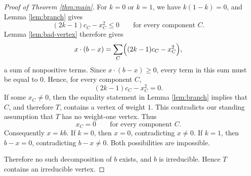 \documentclass[12pt]{article}
\begin{document}
\begin{proof}[Proof of Theorem \ref{thm:main}]
For \(k=0\) or \(k=1\), we have \(k(1-k)=0\), and Lemma \ref{lem:branch} gives
\[
(2k-1)c_C-x_C^2\le 0
\qquad\text{for every component }C.
\]
Lemma \ref{lem:bad-vertex} therefore gives
\[
x\cdot(b-x)
=
\sum_C\Bigl((2k-1)c_C-x_C^2\Bigr),
\]
a sum of nonpositive terms. Since \(x\cdot(b-x)\ge 0\), every term in this sum must be equal to \(0\). Hence, for every component \(C\),
\[
(2k-1)c_C-x_C^2=0.
\]
If some \(x_C\ne 0\), then the equality statement in Lemma \ref{lem:branch} implies that \(C\), and therefore \(T\), contains a vertex of weight \(1\). This contradicts our standing assumption that \(T\) has no weight-one vertex. Thus
\[
x_C=0
\qquad\text{for every component }C.
\]
Consequently \(x=kb\). If \(k=0\), then \(x=0\), contradicting \(x\ne 0\). If \(k=1\), then \(b-x=0\), contradicting \(b-x\ne 0\). Both possibilities are impossible.

Therefore no such decomposition of \(b\) exists, and \(b\) is irreducible. Hence \(T\) contains an irreducible vertex.
\end{proof}
\end{document}
